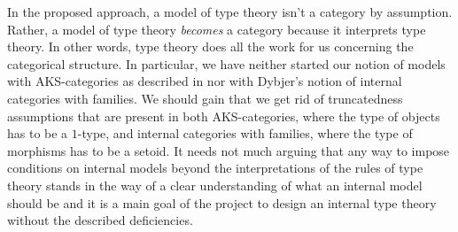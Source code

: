 In the proposed approach, a model of type theory isn't a category by assumption. Rather,
a model of type theory \emph{becomes} a category because it interprets type
theory. In other words, type theory does all the work for us concerning the
categorical structure. In particular, we have neither started our notion of models
with AKS-categories as described in \cite{1categories} nor with Dybjer's notion
of internal categories with families. We should gain that we get rid of
truncatedness assumptions that are present in both AKS-categories, where the
type of objects has to be a $1$-type, and internal categories with families,
where the type of morphisms has to be a setoid. It needs not much arguing that any way to impose
conditions on internal models beyond the interpretations of the rules of
type theory stands in the way of a clear understanding of what an internal
model should be and it is a main goal of the project to design
an internal type theory without the described deficiencies. 

